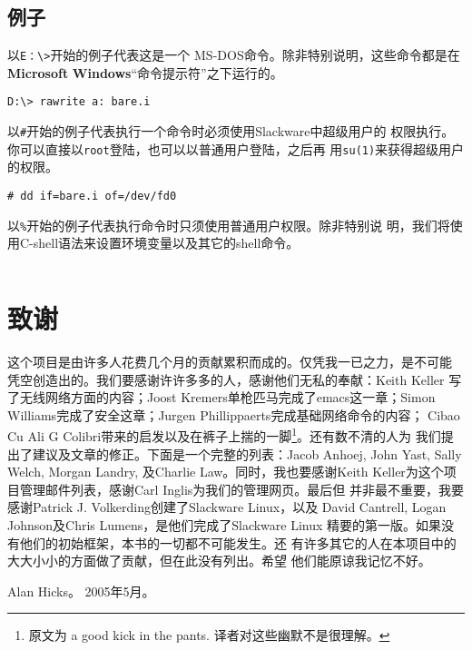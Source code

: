 \subsection*{例子}
\label{sec:preface:conventions:examples}

以\texttt{E：\textbackslash{}\textgreater}开始的例子代表这是一个
MS-DOS\textregistered{}命令。除非特别说明，这些命令都是在
\textbf{Microsoft}\textregistered{}
\textbf{Windows}\textregistered{}``命令提示符''之下运行的。
\begin{Verbatim}[frame=single]
D:\> rawrite a: bare.i
\end{Verbatim}

以\texttt{\#}开始的例子代表执行一个命令时必须使用Slackware中超级用户的
权限执行。你可以直接以\texttt{root}登陆，也可以以普通用户登陆，之后再
用\texttt{su(1)}来获得超级用户的权限。
\begin{Verbatim}[frame=single]
# dd if=bare.i of=/dev/fd0
\end{Verbatim}

以\texttt{\%}开始的例子代表执行命令时只须使用普通用户权限。除非特别说
明，我们将使用C-shell语法来设置环境变量以及其它的shell命令。
\begin{Verbatim}[frame=single]
% top
\end{Verbatim}

\section*{致谢}
\label{sec:preface:acknowledgments}

这个项目是由许多人花费几个月的贡献累积而成的。仅凭我一已之力，是不可能
凭空创造出的。我们要感谢许许多多的人，感谢他们无私的奉献：Keith Keller
写了无线网络方面的内容；Joost Kremers单枪匹马完成了emacs这一章；Simon
Williams完成了安全这章；Jurgen Phillippaerts完成基础网络命令的内容；
Cibao Cu Ali G Colibri带来的启发以及在裤子上揣的一脚\footnote{原文为 a
good kick in the pants. 译者对这些幽默不是很理解。}。还有数不清的人为
我们提出了建议及文章的修正。下面是一个完整的列表：Jacob Anhoej, John
Yast, Sally Welch, Morgan Landry, 及Charlie Law。同时，我也要感谢Keith
Keller为这个项目管理邮件列表，感谢Carl Inglis为我们的管理网页。最后但
并非最不重要，我要感谢Patrick J. Volkerding创建了Slackware Linux，以及
David Cantrell, Logan Johnson及Chris Lumens，是他们完成了Slackware
Linux 精要的第一版。如果没有他们的初始框架，本书的一切都不可能发生。还
有许多其它的人在本项目中的大大小小的方面做了贡献，但在此没有列出。希望
他们能原谅我记忆不好。

Alan Hicks。 2005年5月。




